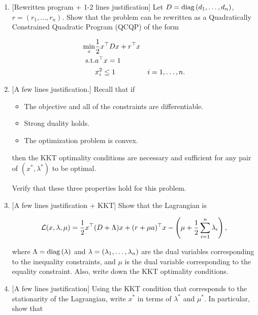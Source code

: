 \begin{enumerate}

\item 
{[Rewritten program + 1-2 lines justification]}
Let $D=\mathrm{diag}\left({d_1,\ldots,d_n}\right)$, $r=(r_1,\ldots,r_n)$. Show that the problem can be rewritten as a Quadratically Constrained Quadratic Program (QCQP) of the form

\begin{align*}
    \min_x & \frac{1}{2}x^{\top} D x + r^{\top} x \\
    \mathop{\mathrm{s.t.}} & a^{\top} x =1 \\
    & x_i^2\leq 1 & i=1,\ldots,n.
\end{align*}

\sol{

}

\item 
{[A few lines justification.]}
Recall that if 

\begin{itemize}
    \item The objective and all of the constraints are differentiable.
    \item Strong duality holds.
    \item  The optimization problem is convex.
\end{itemize}

then the KKT optimality conditions are  necessary and sufficient for any pair of $(x^*, \lambda^*)$ to be optimal. 


Verify that these three properties hold for this problem. 

\sol{

}

\item 
{[A few lines justification + KKT]}
Show that the Lagrangian is

\[
{\mathcal L}(x,\lambda,\mu) = \frac{1}{2}x^{\top}(D+\Lambda)x + (r+\mu a)^{\top} x -\left(\mu+ \frac{1}{2}\sum_{i=1}^n{\lambda_i} \right),
\]

where $\Lambda = \mathrm{diag}\left({\lambda}\right)$ and $\lambda=(\lambda_1,\ldots,\lambda_n)$ are the dual variables corresponding to the inequality constraints, and $\mu$ is the dual variable corresponding to the equality constraint. Also, write down the KKT optimality conditions.

\sol{

}

\item 
{[A few lines justification]}
Using the KKT condition that corresponds to the stationarity of the Lagrangian, write $x^*$ in terms of $\lambda^*$ and $\mu^*$. In particular, show that


\end{enumerate}

